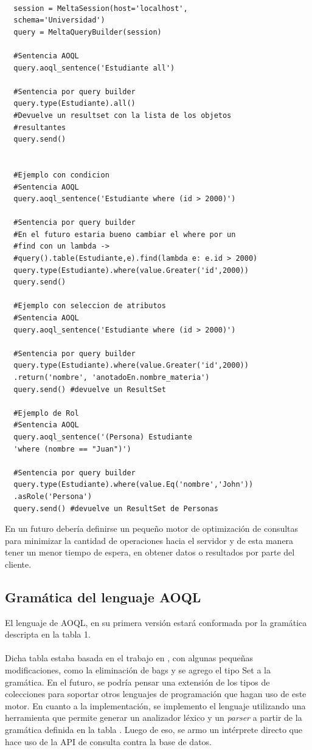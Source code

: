 \documentclass{melta}
\begin{document}
\begin{verbatim}
  
  session = MeltaSession(host='localhost',
  schema='Universidad')
  query = MeltaQueryBuilder(session)
  
  #Sentencia AOQL
  query.aoql_sentence('Estudiante all')

  #Sentencia por query builder
  query.type(Estudiante).all()
  #Devuelve un resultset con la lista de los objetos
  #resultantes
  query.send() 


  #Ejemplo con condicion
  #Sentencia AOQL
  query.aoql_sentence('Estudiante where (id > 2000)')

  #Sentencia por query builder
  #En el futuro estaria bueno cambiar el where por un
  #find con un lambda -> 
  #query().table(Estudiante,e).find(lambda e: e.id > 2000) 
  query.type(Estudiante).where(value.Greater('id',2000))
  query.send()

  #Ejemplo con seleccion de atributos
  #Sentencia AOQL
  query.aoql_sentence('Estudiante where (id > 2000)')

  #Sentencia por query builder
  query.type(Estudiante).where(value.Greater('id',2000))
  .return('nombre', 'anotadoEn.nombre_materia')
  query.send() #devuelve un ResultSet 

  #Ejemplo de Rol
  #Sentencia AOQL
  query.aoql_sentence('(Persona) Estudiante 
  'where (nombre == "Juan")')
  
  #Sentencia por query builder
  query.type(Estudiante).where(value.Eq('nombre','John'))
  .asRole('Persona')
  query.send() #devuelve un ResultSet de Personas

\end{verbatim}

En un futuro debería definirse un pequeño motor de optimización de consultas para minimizar la cantidad de operaciones hacia el servidor y de esta manera tener un menor tiempo de espera, en obtener datos o resultados por parte del cliente.

\subsection*{Gramática del lenguaje AOQL}

El lenguaje de AOQL, en su primera versión estará conformada por la gramática descripta en la tabla 1.
\\\\
Dicha tabla estaba basada en el trabajo en \cite{OMG:oodbs}, con algunas pequeñas modificaciones, como la eliminación de bags y se agrego el tipo Set a la gramática. En el futuro, se podría pensar una extensión de los tipos de colecciones para soportar otros lenguajes de programación que hagan uso de este motor. En cuanto a la implementación, se implemento el lenguaje utilizando una herramienta que permite generar un analizador léxico y un \textit{parser} a partir de la gramática definida en la tabla \cite{Comp:AhoSethiUllman}. Luego de eso, se armo un intérprete directo que hace uso de la API de consulta contra la base de datos.
\end{document}
